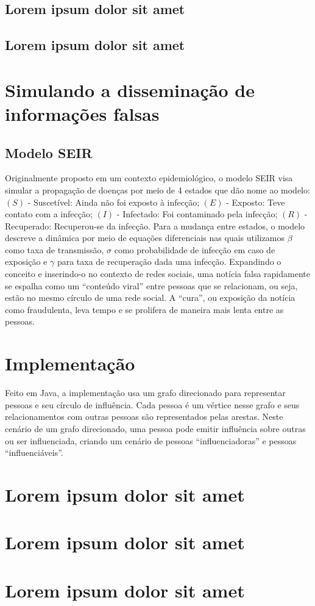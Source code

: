 \subsection{Lorem ipsum dolor sit amet}\label{sec:LABEL_CHP_1_SEC_D}

\subsection{Lorem ipsum dolor sit amet}\label{sec:LABEL_CHP_1_SEC_E}

\section{Simulando a disseminação de informações falsas}\label{sec:LABEL_CHP_1_SEC_F}

\subsection{Modelo SEIR}\label{sec:LABEL_CHP_1_SEC_G}
Originalmente proposto em um contexto epidemiológico, o modelo SEIR visa simular a propagação de doenças por meio de 4 estados que dão nome ao modelo: 
$(S)$ - Suscetível: Ainda não foi exposto à infecção;
$(E)$ - Exposto: Teve contato com a infecção;
$(I)$ - Infectado: Foi contaminado pela infecção;
$(R)$ - Recuperado: Recuperou-se da infecção.
Para a mudança entre estados, o modelo descreve a dinâmica por meio de equações diferenciais nas quais utilizamos $\beta$ como taxa de transmissão, $\sigma$ como probabilidade de infecção em caso de exposição e $\gamma$ para taxa de recuperação dada uma infecção.
Expandindo o conceito e inserindo-o no contexto de redes sociais, uma notícia falsa rapidamente se espalha como um ``conteúdo viral'' entre pessoas que se relacionam, ou seja, estão no mesmo círculo de uma rede social. A ``cura'', ou exposição da notícia como fraudulenta, leva tempo e se prolifera de maneira mais lenta entre as pessoas.

\section{Implementação}\label{sec:LABEL_CHP_1_SEC_H}
Feito em Java, a implementação usa um grafo direcionado para representar pessoas e seu círculo de influência. Cada pessoa é um vértice nesse grafo e seus relacionamentos com outras pessoas são representados pelas arestas. Neste cenário de um grafo direcionado, uma pessoa pode emitir influência sobre outras ou ser influenciada, criando um cenário de pessoas ``influenciadoras'' e pessoas ``influenciáveis''.
\section{Lorem ipsum dolor sit amet}\label{sec:LABEL_CHP_1_SEC_I}

\section{Lorem ipsum dolor sit amet}\label{sec:LABEL_CHP_1_SEC_J}

\section{Lorem ipsum dolor sit amet}\label{sec:LABEL_CHP_1_SEC_K}